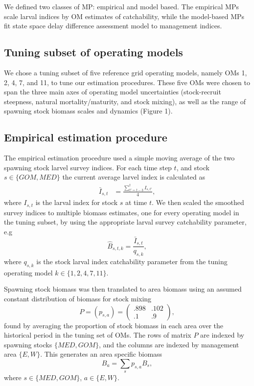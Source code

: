 \documentclass[]{article}
\begin{document}
We defined two classes of MP: empirical and model based. The empirical MPs
scale larval indices by OM estimates of catchability, while the
model-based MPs fit state space delay difference assessment model
to management indices.

\hypertarget{tuning-subset-of-operating-models}{%
\subsection{Tuning subset of operating models}\label{tuning-subset-of-operating-models}}

We chose a tuning subset of five reference grid operating models,
namely OMs 1, 2, 4, 7, and 11, to tune our estimation procedures.
These five OMs were chosen to span the three main axes
of operating model uncertainties (stock-recruit steepness, natural
mortality/maturity, and stock mixing), as well as the range of spawning
stock biomass scales and dynamics (Figure 1).

\hypertarget{empirical-estimation-procedure}{%
\subsection{Empirical estimation procedure}\label{empirical-estimation-procedure}}

The empirical estimation procedure used a simple moving average of
the two spawning stock larvel survey indices. For each time step \(t\),
and stock \(s \in \{GOM, MED\}\) the current average larvel index is
calculated as
\begin{align}
\bar{I}_{s,t} & = \frac{\sum_{t'= t-3}^{t} I_{s,t'}}{4}, 
\end{align}
where \(I_{s,t}\) is the larval index for stock \(s\) at time \(t\). We then
scaled the smoothed survey indices to multiple biomass estimates, one
for every operating model in the tuning subset, by using the appropriate
larval survey catchability parameter, e.g
\begin{equation}
\hat{B}_{s,t,k} = \frac{\bar{I}_{s,t}}{q_{s,k}},
\end{equation}
where \(q_{s,k}\) is the stock larval index catchability parameter from
the tuning operating model \(k \in \{1,2,4,7,11\}\).

Spawning stock biomass was then translated to area biomass using an
assumed constant distribution of biomass for stock mixing
\begin{equation}
P = (p_{s,a}) =  \left( \begin{array}{cc}
                .898 & .102 \\
                .1 & .9
            \end{array}
    \right),                    
\end{equation}
found by averaging the proportion of stock biomass in each area
over the historical period in the tuning set of OMs. The rows
of matrix \(P\) are indexed by spawning stocks \(\{MED, GOM\}\), and the
columns are indexed by management area \(\{ E, W\}\). This generates
an area specific biomass
\begin{equation}
B_a = \sum_{s} p_{s,a} B_s,
\end{equation}
where \(s \in \{MED, GOM\}\), \(a \in \{E, W\}\).
\end{document}
